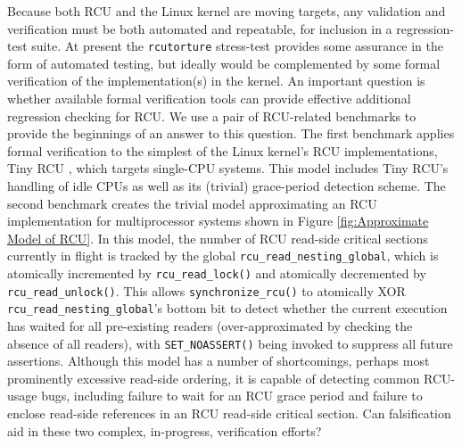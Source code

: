 \documentclass[conference]{IEEEtran}
\begin{document}
Because both RCU and the Linux kernel are moving targets, any validation
and verification must be both automated and repeatable, for inclusion
in a regression-test suite.  At present the {\tt rcutorture}
stress-test provides some assurance in the form of automated testing,
but ideally would be complemented by some formal verification of the
implementation(s) in the kernel.  An important question is whether
available formal verification tools can provide effective additional
regression checking for RCU.
We use a pair of RCU-related benchmarks \cite{PaulBlog1,PaulBlog2} to
provide the beginnings of an answer to this question.  The first
benchmark applies formal verification to the simplest of the Linux
kernel's RCU implementations, Tiny RCU
\cite{PaulEMcKenney2009BloatwatchRCU}, which targets single-CPU
systems.  This model includes Tiny RCU's handling of idle CPUs as well
as its (trivial) grace-period detection scheme.  The second benchmark
creates the trivial model approximating an RCU implementation for
multiprocessor systems shown in Figure \ref{fig:Approximate Model of
  RCU}.  In this model, the number of RCU read-side critical sections
currently in flight is tracked by the global
{\tt rcu\_read\_nesting\_global}, which is atomically incremented by
{\tt rcu\_read\_lock()} and atomically decremented by
{\tt rcu\_read\_unlock()}.  This allows {\tt synchronize\_rcu()} to
atomically XOR {\tt rcu\_read\_nesting\_global}'s bottom bit to detect
whether the current execution has waited for all pre-existing readers
(over-approximated by checking the absence of all readers), with
{\tt SET\_NOASSERT()} being invoked to suppress all future assertions.
Although this model has a number of shortcomings, perhaps most
prominently excessive read-side ordering, it is capable of detecting
common RCU-usage bugs, including failure to wait for an RCU grace
period and failure to enclose read-side references in an RCU read-side
critical section.  Can falsification aid in these two complex,
in-progress, verification efforts?
\end{document}
